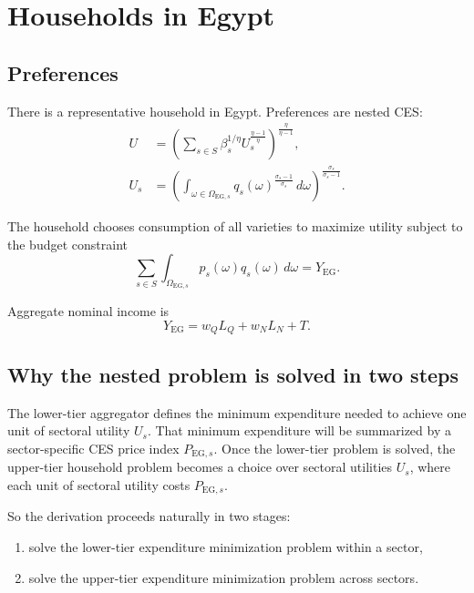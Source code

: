 \documentclass[11pt]{article}
\begin{document}
\section{Households in Egypt}

\subsection{Preferences}

There is a representative household in Egypt. Preferences are nested CES:
\begin{align}
U &= \left(\sum_{s\in S}\beta_s^{1/\eta} U_s^{\frac{\eta-1}{\eta}}\right)^{\frac{\eta}{\eta-1}}, \label{eq:upperCES_full}\\
U_s &= \left(\int_{\omega\in\Omega_{\mathrm{EG},s}} q_s(\omega)^{\frac{\sigma_s-1}{\sigma_s}}\,d\omega\right)^{\frac{\sigma_s}{\sigma_s-1}}. \label{eq:lowerCES_full}
\end{align}

The household chooses consumption of all varieties to maximize utility subject to the budget constraint
\begin{equation}
\sum_{s\in S}\int_{\Omega_{\mathrm{EG},s}} p_s(\omega)q_s(\omega)\,d\omega = Y_{\mathrm{EG}}.
\end{equation}

Aggregate nominal income is
\begin{equation}
Y_{\mathrm{EG}} = w_Q L_Q + w_N L_N + T.
\end{equation}

\subsection{Why the nested problem is solved in two steps}

The lower-tier aggregator defines the minimum expenditure needed to achieve one unit of sectoral utility \(U_s\). That minimum expenditure will be summarized by a sector-specific CES price index \(P_{\mathrm{EG},s}\). Once the lower-tier problem is solved, the upper-tier household problem becomes a choice over sectoral utilities \(U_s\), where each unit of sectoral utility costs \(P_{\mathrm{EG},s}\).

So the derivation proceeds naturally in two stages:
\begin{enumerate}[leftmargin=*]
    \item solve the lower-tier expenditure minimization problem within a sector,
    \item solve the upper-tier expenditure minimization problem across sectors.
\end{enumerate}
\end{document}
